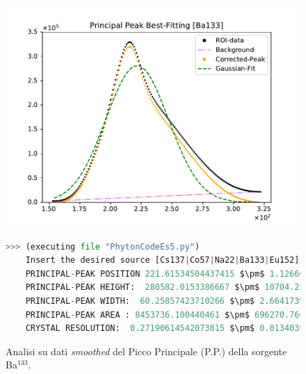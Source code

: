 \begin{figure}[h!]
	\centering
	\caption{Analisi su dati \emph{smoothed} del Picco Principale (P.P.) della sorgente Ba$^{133}$. }
	\includegraphics[width =  \textwidth,trim={1cm 0 1cm 0}, clip]{Immagini/Peak-Fitting_Ba133.pdf}
	\label{fig:PPBa133} \bigskip\bigskip
	\begin{lstlisting}[language=python, style=Pystyle, mathescape=true]
	>>> (executing file "PhytonCodeEs5.py")
	Insert the desired source [Cs137|Co57|Na22|Ba133|Eu152]: Ba133
	PRINCIPAL-PEAK POSITION 221.61534504437415 $\pm$ 1.1266699889196987
	PRINCIPAL-PEAK HEIGHT:  280582.0153386667 $\pm$ 10704.239741249454
	PRINCIPAL-PEAK WIDTH:  60.25857423710266 $\pm$ 2.6641739924518424
	PRINCIPAL-PEAK AREA : 8453736.100440461 $\pm$ 696270.7665574122
	CRYSTAL RESOLUTION:  0.27190614542073815 $\pm$ 0.013403956687680785
	\end{lstlisting}\bigskip\bigskip
\end{figure}

\newpage

